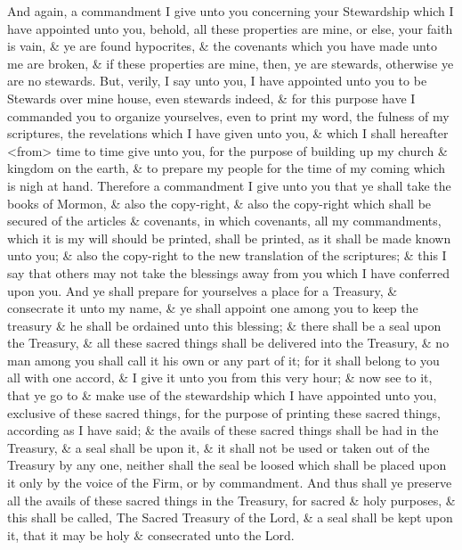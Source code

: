 					And again, a commandment I give unto you concerning your Stewardship which I have appointed unto you, behold, all these properties are mine, or else, your faith is vain, \& ye are found hypocrites, \& the covenants which you have made unto me are broken, \& if these properties are mine, then, ye are stewards, otherwise ye are no stewards. But, verily, I say unto you, I have appointed unto you to be Stewards over mine house, even stewards indeed, \& for this purpose have I commanded you to organize yourselves, even to print my word, the fulness of my scriptures, the revelations which I have given unto you, \& which I shall hereafter <from> time to time give unto you, for the purpose of building up my church \& kingdom on the earth, \& to prepare my people for the time of my coming which is nigh at hand. Therefore a commandment I give unto you that ye shall take the books of Mormon, \& also the copy-right, \& also the copy-right which shall be secured of the articles \& covenants, in which covenants, all my commandments, which it is my will should be printed, shall be printed, as it shall be made known unto you; \& also the copy-right to the new translation of the scriptures; \& this I say that others may not take the blessings away from you which I have conferred upon you. And ye shall prepare for yourselves a place for a Treasury, \& consecrate it unto my name, \& ye shall appoint one among you to keep the treasury \& he shall be ordained unto this blessing; \& there shall be a seal upon the Treasury, \& all these sacred things shall be delivered into the Treasury, \& no man among you shall call it his own or any part of it; for it shall belong to you all with one accord, \& I give it unto you from this very hour; \& now see to it, that ye go to \& make use of the stewardship which I have appointed unto you, exclusive of these sacred things, for the purpose of printing these sacred things, according as I have said; \& the avails of these sacred things shall be had in the Treasury, \& a seal shall be upon it, \& it shall not be used or taken out of the Treasury by any one, neither shall the seal be loosed which shall be placed upon it only by the voice of the Firm, or by commandment. And thus shall ye preserve all the avails of these sacred things in the Treasury, for sacred \& holy purposes, \& this shall be called, The Sacred Treasury of the Lord, \& a seal shall be kept upon it, that it may be holy \& consecrated unto the Lord.


